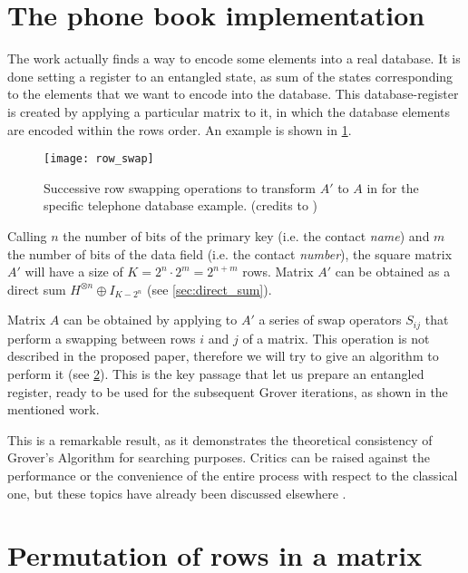 \section{The phone book implementation}

The work \cite{alsing2011grover} actually finds a way to encode some elements into a real database. It is done setting a register to an entangled state, as sum of the states corresponding to the elements that we want to encode into the database. This database-register is created by applying a particular matrix to it, in which the database elements are encoded within the rows order. An example is shown in \cref{fig:row_swap}.

\begin{figure}
	\centering
	\texttt{[image: row\_swap]}
	\caption{Successive row swapping operations to transform $A'$ to $A$ in for the specific telephone database example. (credits to \cite{alsing2011grover})}
	\label{fig:row_swap}
\end{figure}

Calling $n$ the number of bits of the primary key (i.e. the contact \textit{name}) and $m$ the number of bits of the data field (i.e. the contact \textit{number}), the square matrix $A'$ will have a size of $K = 2^n \cdot 2^m = 2^{n+m}$ rows. Matrix $A'$ can be obtained as a direct sum $H^{\otimes n} \oplus I_{K-2^n}$ (see \cref{sec:direct_sum}).

Matrix $A$ can be obtained by applying to $A'$ a series of swap operators $S_{ij}$ that perform a swapping between rows $i$ and $j$ of a matrix. This operation is not described in the proposed paper, therefore we will try to give an algorithm to perform it (see \cref{sec:permutation}). This is the key passage that let us prepare an entangled register, ready to be used for the subsequent Grover iterations, as shown in the mentioned work.

\bigskip

This is a remarkable result, as it demonstrates the theoretical consistency of Grover's Algorithm for searching purposes. Critics can be raised against the performance or the convenience of the entire process with respect to the classical one, but these topics have already been discussed elsewhere \cite{1425397}.

\section{Permutation of rows in a matrix}
\label{sec:permutation}


